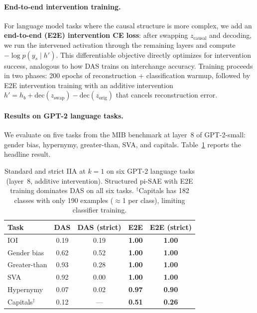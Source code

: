 \documentclass{article}
\begin{document}
\paragraph{End-to-end intervention training.}
For language model tasks where the causal structure is more complex, we add an
\textbf{end-to-end (E2E) intervention CE loss}: after swapping $z_\text{causal}$
and decoding, we run the intervened activation through the remaining layers and
compute $-\log p(y_s \mid h')$. This differentiable objective directly
optimizes for intervention success, analogous to how DAS trains on interchange
accuracy. Training proceeds in two phases: 200 epochs of reconstruction +
classification warmup, followed by E2E intervention training with an additive
intervention $h' = h_b + \text{dec}(z_\text{swap}) - \text{dec}(z_\text{orig})$
that cancels reconstruction error.

\paragraph{Results on GPT-2 language tasks.}
We evaluate on five tasks from the MIB benchmark \citep{prakash2024mib} at
layer~8 of GPT-2-small: gender bias, hypernymy, greater-than, SVA, and
capitals. Table~\ref{tab:nlp_results} reports the headline result.

\begin{table}[t]
\centering
\small
\setlength{\tabcolsep}{4pt}
\begin{tabular}{lcccc}
\toprule
\textbf{Task} & \textbf{DAS} & \textbf{DAS (strict)} & \textbf{E2E} & \textbf{E2E (strict)} \\
\midrule
IOI            & 0.19 & 0.19 & \textbf{1.00} & \textbf{1.00} \\
Gender bias    & 0.62 & 0.52 & \textbf{1.00} & \textbf{1.00} \\
Greater-than   & 0.93 & 0.28 & \textbf{1.00} & \textbf{1.00} \\
SVA            & 0.92 & 0.00 & \textbf{1.00} & \textbf{1.00} \\
Hypernymy      & 0.07 & 0.02 & \textbf{0.97} & \textbf{0.90} \\
Capitals$^\dagger$ & 0.12 & ---  & \textbf{0.51} & \textbf{0.26} \\
\bottomrule
\end{tabular}
\caption{Standard and strict IIA at $k{=}1$ on six GPT-2 language tasks
(layer~8, additive intervention). Structured pi-SAE with E2E training
dominates DAS on all six tasks. $^\dagger$Capitals has 182 classes with
only 190 examples ($\approx$1 per class), limiting classifier training.}
\label{tab:nlp_results}
\end{table}
\end{document}
